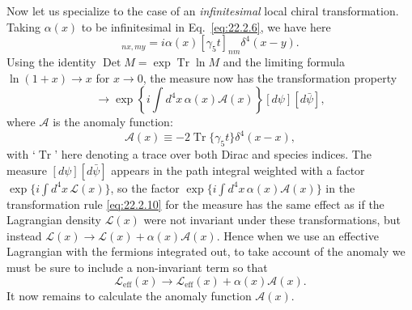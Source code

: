 Now let us specialize to the case of an \emph{infinitesimal} local chiral
transformation. Taking $\alpha(x)$ to be infinitesimal in
Eq.~\eqref{eq:22.2.6}, we have here
\begin{equation}
 [\mathcal U-\mathbf{1}]_{nx,my}
 =i\alpha(x)[\gamma_5t]_{nm}\delta^4(x-y).
 \tag{22.2.9}\label{eq:22.2.9}
\end{equation}
Using the identity $\operatorname{Det}M=\exp\operatorname{Tr}\ln M$ and
the limiting formula $\ln(1+x)\to x$ for $x\to0$, the measure now has the
transformation property
\begin{equation}
 [d\psi][d\bar\psi]\longrightarrow
 \exp\left\{i\int d^4x\,\alpha(x)\mathcal A(x)\right\}
 [d\psi][d\bar\psi],
 \tag{22.2.10}\label{eq:22.2.10}
\end{equation}
where $\mathcal A$ is the anomaly function:
\begin{equation}
 \mathcal A(x)\equiv-2\operatorname{Tr}\{\gamma_5t\}\delta^4(x-x),
 \tag{22.2.11}\label{eq:22.2.11}
\end{equation}
with `$\operatorname{Tr}$' here denoting a trace over both Dirac and species
indices. The measure $[d\psi][d\bar\psi]$ appears in the path integral
weighted with a factor $\exp\{i\int d^4x\,\mathcal L(x)\}$, so the
factor\linebreak
$\exp\{i\int d^4x\,\alpha(x)\mathcal A(x)\}$ in the transformation rule
\eqref{eq:22.2.10} for the measure has the same effect as if the Lagrangian
density $\mathcal L(x)$ were not invariant under these transformations, but
instead $\mathcal L(x)\to\mathcal L(x)+\alpha(x)\mathcal A(x)$. Hence when
we use an effective Lagrangian with the fermions integrated out, to take
account of the anomaly we must be sure to include a non-invariant term so
that
\begin{equation}
 \mathcal L_{\mathrm{eff}}(x)\longrightarrow
 \mathcal L_{\mathrm{eff}}(x)+\alpha(x)\mathcal A(x).
 \tag{22.2.12}\label{eq:22.2.12}
\end{equation}
It now remains to calculate the anomaly function $\mathcal A(x)$.

